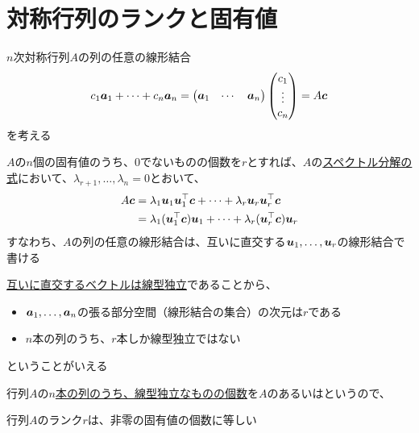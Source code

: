 \documentclass[../../../topic_linear-algebra]{subfiles}
\begin{document}
\sectionline
\section{対称行列のランクと固有値}

$n$次対称行列$A$の列の任意の線形結合
\begin{equation*}
  c_1\vb*{a}_1 + \cdots + c_n\vb*{a}_n = \begin{pmatrix}
    \vb*{a}_1 & \cdots & \vb*{a}_n
  \end{pmatrix} \begin{pmatrix}
    c_1    \\
    \vdots \\
    c_n
  \end{pmatrix} = A\vb*{c}
\end{equation*}
を考える

\br

$A$の$n$個の固有値のうち、0でないものの個数を$r$とすれば、$A$の\hyperref[thm:spectral-decomposition-symmetric]{スペクトル分解の式}において、$\lambda_{r+1}, \ldots, \lambda_n = 0$とおいて、
\begin{align*}
  A\vb*{c} & = \lambda_1\vb*{u}_1\vb*{u}_1^\top\vb*{c} + \cdots + \lambda_r\vb*{u}_r\vb*{u}_r^\top\vb*{c}     \\
           & = \lambda_1(\vb*{u}_1^\top\vb*{c})\vb*{u}_1 + \cdots + \lambda_r(\vb*{u}_r^\top\vb*{c})\vb*{u}_r
\end{align*}
すなわち、$A$の列の任意の線形結合は、互いに直交する$\vb*{u}_1, \ldots, \vb*{u}_r$の線形結合で書ける

\br

\hyperref[thm:orthogonal-set-is-independent]{互いに直交するベクトルは線型独立}であることから、
\begin{itemize}
  \item $\vb*{a}_1, \ldots, \vb*{a}_n$の張る部分空間（線形結合の集合）の次元は$r$である
  \item $n$本の列のうち、$r$本しか線型独立ではない
\end{itemize}
ということがいえる

\br

行列$A$の\hyperref[thm:rank-equals-max-indep-cols]{$n$本の列のうち、線型独立なものの個数}を$A$のあるいはというので、

\begin{shaded}
  行列$A$のランク$r$は、非零の固有値の個数に等しい
\end{shaded}
\end{document}
